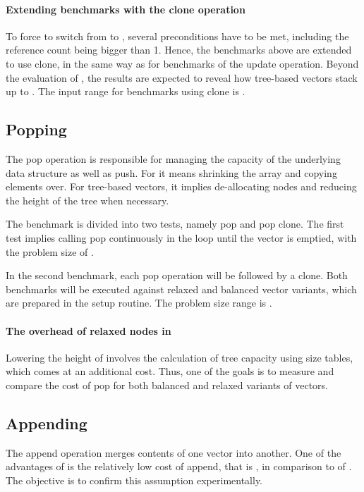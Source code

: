 \paragraph{Extending benchmarks with the clone operation}
To force \pvec{} to switch from \stdvec{} to \rrbvec{}, several preconditions have to be met, including the reference count being bigger than 1. Hence, the benchmarks above are extended to use clone, in the same way as for benchmarks of the update operation. Beyond the evaluation of \pvec{}, the results are expected to reveal how tree-based vectors stack up to \stdvec{}. The input range for benchmarks using clone is \range{[20, \kilo{40}]}.

\subsection{Popping}
The pop operation is responsible for managing the capacity of the underlying data structure as well as push. For \stdvec{} it means shrinking the array and copying elements over. For tree-based vectors, it implies de-allocating nodes and reducing the height of the tree when necessary.

The benchmark is divided into two tests, namely pop and pop clone. The first test implies calling pop continuously in the loop until the vector is emptied, with the problem size of \range{[20, \kilo{60}]}.

In the second benchmark, each pop operation will be followed by a clone. Both benchmarks will be executed against relaxed and balanced vector variants, which are prepared in the setup routine. The problem size range is \range{[20, \kilo{20}]}.

\paragraph{The overhead of relaxed nodes in \rrbtree{}}
Lowering the height of \rrbtree{} involves the calculation of tree capacity using size tables, which comes at an additional cost. Thus, one of the goals is to measure and compare the cost of pop for both balanced and relaxed variants of vectors.

\subsection{Appending}
The append operation merges contents of one vector into another. One of the advantages of \rrbtree{} is the relatively low cost of append, that is , in comparison to  of \stdvec{}. The objective is to confirm this assumption experimentally.


